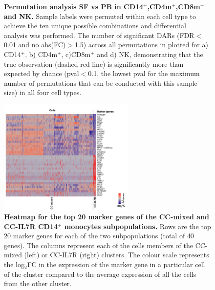 \begin{figure}[htbp]
\begin{subfigure}[b]{0.45\textwidth}
\caption{}
\end{subfigure}
\caption[Permutation analysis SF vs PB in CD14$^+$,CD4m$^+$,CD8m$^+$ and NK.]{\textbf{Permutation analysis SF vs PB in CD14$^+$,CD4m$^+$,CD8m$^+$ and NK.} Sample labels were permuted within each cell type to achieve the ten unique possible combinations and differential analysis was performed. The number of significant DARs (FDR$<$0.01 and no abs(FC)$>$1.5) across all permutations in plotted for a)  CD14$^+$, b) CD4m$^+$, c)CD8m$^+$ and d) NK, demonstrating that the true observation (dashed red line) is significantly more than expected by chance (pval$<$0.1, the lowest pval for the maximum number of permutations that can be conducted with this sample size) in all four cell types.}
\label{figure:PsA_perm_analysis}
\end{figure}



\begin{figure}[htbp]
\centering
\includegraphics[width=0.6\textwidth]{./Appendix/pdfs/Chapter5/PSA_10X_heatmap_SF_PB_monocytes_clusters_mixed_and_IL7R}
\caption[Heatmap for the top 20 marker genes of the CC-mixed and CC-IL7R CD14$^+$ monocytes subpopulations.]{\textbf{Heatmap for the top 20 marker genes of the CC-mixed and CC-IL7R CD14$^+$ monocytes subpopulations.} Rows are the top 20 marker genes for each of the two subpopulations (total of 40 genes). The columns represent each of the cells members of the CC-mixed (left) or CC-IL7R (right) clusters. The colour scale represents the log$_2$FC in the expression of the marker gene in a particular cell of the cluster compared to the average expression of all the cells from the other cluster.}
\label{figure:PSA_scRNAseq_CC_mixed_and_IL7R_markers_heatmap}
\end{figure}

